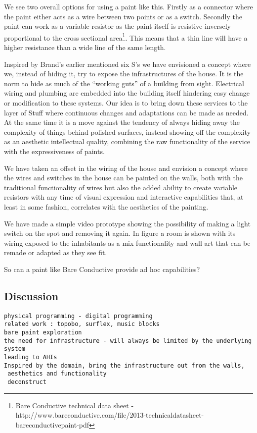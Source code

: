 We see two overall options for using a paint like this.
Firstly as a connector where the paint either acts as a wire between two points or as a switch.
Secondly the paint can work as a variable resistor as the paint itself is resistive inversely proportional to the cross sectional area\footnote{Bare Conductive technical data sheet - http://www.bareconductive.com/file/2013-technicaldatasheet-bareconductivepaint-pdf}. 
This means that a thin line will have a higher resistance than a wide line of the same length. 

Inspired by Brand's earlier mentioned six S's \citep{brand1995buildings} we have envisioned a concept where we, instead of hiding it, try to expose the infrastructures of the house.
It is the norm to hide as much of the ``working guts'' of a building from sight.
Electrical wiring and plumbing are embedded into the building itself hindering easy change or modification to these systems.
Our idea is to bring down these services to the layer of Stuff where continuous changes and adaptations can be made as needed.
At the same time it is a move against the tendency of always hiding away the complexity of things behind polished surfaces, instead showing off the complexity as an aesthetic intellectual quality, combining the raw functionality of the service with the expressiveness of paints.

We have taken an offset in the wiring of the house and envision a concept where the wires and switches in the house can be painted on the walls, both with the traditional functionality of wires but also the added ability to create variable resistors with any time of visual expression and interactive capabilities that, at least in some fashion, correlates with the aesthetics of the painting.

We have made a simple video prototype showing the possibility of making a light switch on the spot and removing it again.
In figure  a room is shown with its wiring exposed to the inhabitants as a mix functionality and wall art that can be remade or adapted as they see fit.

So can a paint like Bare Conductive provide ad hoc capabilities?


\subsection{Discussion}

\begin{verbatim}
physical programming - digital programming
related work : topobo, surflex, music blocks
bare paint exploration
the need for infrastructure - will always be limited by the underlying system
leading to AHIs
Inspired by the domain, bring the infrastructure out from the walls,
 aesthetics and functionality
 deconstruct
\end{verbatim}
